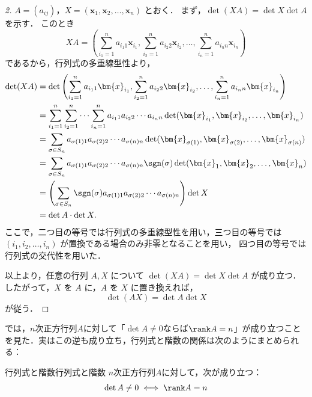 \begin{leftbar}
\begin{proof}[2]
  $A=(a_{ij})$，$X=(\bm{x}_1,\bm{x}_2,\dots,\bm{x}_n)$ とおく．
  まず，$\det(XA)=\det X\det A$ を示す．
  このとき
  \[
    XA=
    \left(
      \sum_{i_1=1}^{n} a_{i_1 1}\bm{x}_{i_1},
      \sum_{i_2=1}^{n} a_{i_2 2}\bm{x}_{i_2},
      \dots,
      \sum_{i_n=1}^{n} a_{i_n n}\bm{x}_{i_n}
    \right)
  \]
  であるから，行列式の多重線型性より，
  \begin{align*}
    \det(XA)
    &=
    \det\left(
      \sum_{i_1=1}^{n} a_{i_1 1}\bm{x}_{i_1},
      \sum_{i_2=1}^{n} a_{i_2 2}\bm{x}_{i_2},
      \dots,
      \sum_{i_n=1}^{n} a_{i_n n}\bm{x}_{i_n}
    \right) \\
    &=
    \sum_{i_1=1}^{n}\sum_{i_2=1}^{n}\dotsm\sum_{i_n=1}^{n}
    a_{i_1 1}a_{i_2 2}\dotsm a_{i_n n}
    \det(\bm{x}_{i_1},\bm{x}_{i_2},\dots,\bm{x}_{i_n}) \\
    &=
    \sum_{\sigma\in S_n}
    a_{\sigma(1)1}a_{\sigma(2)2}\dotsm a_{\sigma(n)n}
    \det(\bm{x}_{\sigma(1)},\bm{x}_{\sigma(2)},\dots,\bm{x}_{\sigma(n)}) \\
    &=
    \sum_{\sigma\in S_n}
    a_{\sigma(1)1}a_{\sigma(2)2}\dotsm a_{\sigma(n)n}
    \sgn(\sigma)\det(\bm{x}_1,\bm{x}_2,\dots,\bm{x}_n) \\
    &=
    \left(
      \sum_{\sigma\in S_n}
      \sgn(\sigma)
      a_{\sigma(1)1}a_{\sigma(2)2}\dotsm a_{\sigma(n)n}
    \right)\det X \\
    &=
    \det A \cdot \det X.
  \end{align*}
  ここで，二つ目の等号では行列式の多重線型性を用い，三つ目の等号では
  $(i_1,i_2,\dots,i_n)$ が置換である場合のみ非零となることを用い，
  四つ目の等号では行列式の交代性を用いた．

  以上より，任意の行列 $A,X$ について $\det(XA)=\det X\det A$ が成り立つ．
  したがって，$X$ を $A$ に，$A$ を $X$ に置き換えれば，
  \[
    \det(AX)=\det A\det X
  \]
  が従う．
\end{proof}
\end{leftbar}

では，$n$次正方行列$A$に対して「$\det A \ne 0$ならば$\rank A = n$」が成り立つことを見た．実はこの逆も成り立ち，行列式と階数の関係は次のようにまとめられる：

\begin{prop}{行列式と階数}{行列式と階数}
  $n$次正方行列$A$に対して，次が成り立つ：
  \[
  \det A \ne 0 \iff \rank A = n
  \]
\end{prop}

